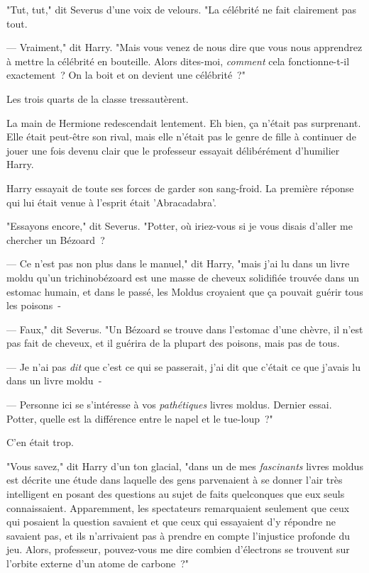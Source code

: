 "Tut, tut," dit Severus d'une voix de velours. "La célébrité ne fait clairement pas tout.

--- Vraiment," dit Harry. "Mais vous venez de nous dire que vous nous apprendrez à mettre la célébrité en bouteille. Alors dites-moi, \emph{comment} cela fonctionne-t-il exactement~? On la boit et on devient une célébrité~?"

Les trois quarts de la classe tressautèrent.

La main de Hermione redescendait lentement. Eh bien, ça n'était pas surprenant. Elle était peut-être son rival, mais elle n'était pas le genre de fille à continuer de jouer une fois devenu clair que le professeur essayait délibérément d'humilier Harry.

Harry essayait de toute ses forces de garder son sang-froid. La première réponse qui lui était venue à l'esprit était 'Abracadabra'.

"Essayons encore," dit Severus. "Potter, où iriez-vous si je vous disais d'aller me chercher un Bézoard~?

--- Ce n'est pas non plus dans le manuel," dit Harry, "mais j'ai lu dans un livre moldu qu'un trichinobézoard est une masse de cheveux solidifiée trouvée dans un estomac humain, et dans le passé, les Moldus croyaient que ça pouvait guérir tous les poisons~-

--- Faux," dit Severus. "Un Bézoard se trouve dans l'estomac d'une chèvre, il n'est pas fait de cheveux, et il guérira de la plupart des poisons, mais pas de tous.

--- Je n'ai pas \emph{dit} que c'est ce qui se passerait, j'ai dit que c'était ce que j'avais lu dans un livre moldu~-

--- Personne ici se s'intéresse à vos \emph{pathétiques} livres moldus. Dernier essai. Potter, quelle est la différence entre le napel et le tue-loup~?"

C'en était trop.

"Vous savez," dit Harry d'un ton glacial, "dans un de mes \emph{fascinants} livres moldus est décrite une étude dans laquelle des gens parvenaient à se donner l'air très intelligent en posant des questions au sujet de faits quelconques que eux seuls connaissaient. Apparemment, les spectateurs remarquaient seulement que ceux qui posaient la question savaient et que ceux qui essayaient d'y répondre ne savaient pas, et ils n'arrivaient pas à prendre en compte l'injustice profonde du jeu. Alors, professeur, pouvez-vous me dire combien d'électrons se trouvent sur l'orbite externe d'un atome de carbone~?"


